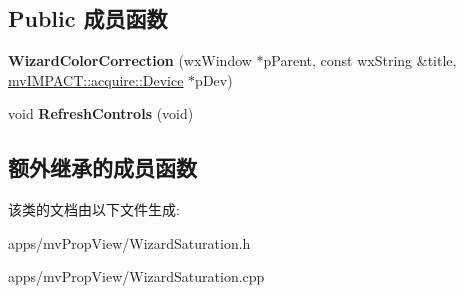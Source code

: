 \subsection*{Public 成员函数}
\begin{DoxyCompactItemize}
\item 
\hypertarget{class_wizard_color_correction_a1b610b5c15f273f825fd7dea2dcb2484}{{\bfseries Wizard\+Color\+Correction} (wx\+Window $\ast$p\+Parent, const wx\+String \&title, \hyperlink{classmv_i_m_p_a_c_t_1_1acquire_1_1_device}{mv\+I\+M\+P\+A\+C\+T\+::acquire\+::\+Device} $\ast$p\+Dev)}\label{class_wizard_color_correction_a1b610b5c15f273f825fd7dea2dcb2484}

\item 
\hypertarget{class_wizard_color_correction_a6e6ee7e51b40988c68c68d3a17b47085}{void {\bfseries Refresh\+Controls} (void)}\label{class_wizard_color_correction_a6e6ee7e51b40988c68c68d3a17b47085}

\end{DoxyCompactItemize}
\subsection*{额外继承的成员函数}


该类的文档由以下文件生成\+:\begin{DoxyCompactItemize}
\item 
apps/mv\+Prop\+View/Wizard\+Saturation.\+h\item 
apps/mv\+Prop\+View/Wizard\+Saturation.\+cpp\end{DoxyCompactItemize}
